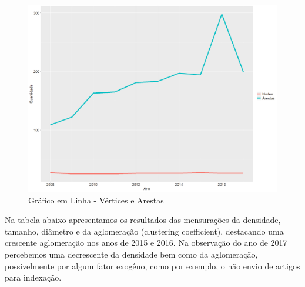 \documentclass[12pt]{article}
\begin{document}
\begin{figure}[H]
\centering
\includegraphics[scale=0.3]{images/nos-arestas.pdf}
\caption{Gráfico em Linha - Vértices e Arestas}
\label{Rede de Coautoria - UF BR 2009}
\end{figure}

Na tabela abaixo apresentamos os resultados das mensurações da densidade, tamanho, diâmetro e da aglomeração (clustering coefficient), destacando uma crescente aglomeração nos anos de 2015 e 2016. Na observação do ano de 2017 percebemos uma decrescente da densidade bem como da aglomeração, possivelmente por algum fator exogêno, como por exemplo, o não envio de artigos para indexação.
\end{document}
